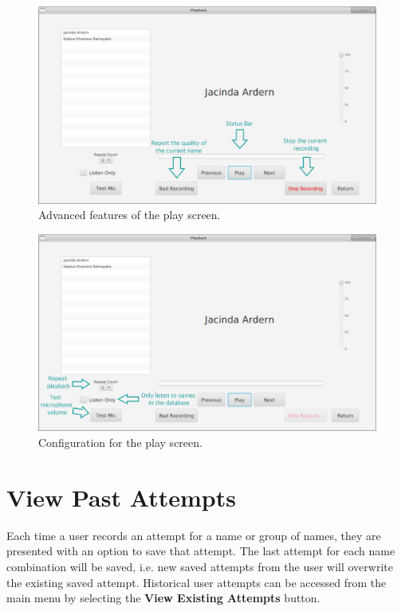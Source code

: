 \documentclass{article}
\begin{document}
\begin{figure}[H]
	\includegraphics[width=\textwidth]{images/10_practice_adv.jpg}
	\caption{Advanced features of the play screen.}
	\label{practiceadv}
\end{figure}

\begin{figure}[H]
	\includegraphics[width=\textwidth]{images/12_practice_config.jpg}
	\caption{Configuration for the play screen.}
	\label{practiceconfig}
\end{figure}

\section{View Past Attempts}

Each time a user records an attempt for a name or group of names, they are
presented with an option to save that attempt. The last attempt for each name
combination will be saved, i.e. new saved attempts from the user will overwrite
the existing saved attempt. Historical user attempts can be accessed from the
main menu by selecting the \textbf{View Existing Attempts} button. \\
\end{document}
